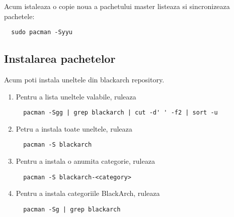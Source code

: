 \documentclass[a4paper, oneside, 11pt]{book}
\begin{document}
Acum istaleaza o copie noua a pachetului master listeaza si sincronizeaza pachetele:
\begin{lstlisting}
  sudo pacman -Syyu
\end{lstlisting}



\subsection{Instalarea pachetelor}
Acum poti instala uneltele din blackarch repository.
\begin{enumerate}
\item Pentru a lista uneltele valabile, ruleaza
\begin{lstlisting}
  pacman -Sgg | grep blackarch | cut -d' ' -f2 | sort -u
\end{lstlisting}

\item Petru a instala toate uneltele, ruleaza
\begin{lstlisting}
  pacman -S blackarch
\end{lstlisting}

\item Pentru a instala o anumita categorie, ruleaza
\begin{lstlisting}
  pacman -S blackarch-<category>
\end{lstlisting}

\item Pentru a instala categoriile BlackArch, ruleaza
\begin{lstlisting}
  pacman -Sg | grep blackarch
\end{lstlisting}

\end{enumerate}
\end{document}
